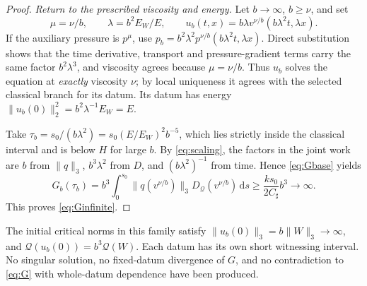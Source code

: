 \documentclass[11pt,a4paper]{article}
\theoremstyle{definition}
\theoremstyle{remark}
\newcommand{\Q}{\mathcal Q}
\newcommand{\dd}{\,\mathrm d}
\newcommand{\norm}[1]{\lVert #1\rVert}
\numberwithin{equation}{section}
\begin{document}
\begin{proof}
\emph{Return to the prescribed viscosity and energy.} Let \(b\to\infty\), \(b\ge\nu\), and set
\[
\mu=\nu/b,\qquad \lambda=b^2E_W/E,
\qquad u_b(t,x)=b\lambda v^{\nu/b}(b\lambda^2t,\lambda x).
\]
If the auxiliary pressure is \(p^\mu\), use \(p_b=b^2\lambda^2p^{\nu/b}(b\lambda^2t,\lambda x)\). Direct substitution shows that the time derivative, transport and pressure-gradient terms carry the same factor \(b^2\lambda^3\), and viscosity agrees because \(\mu=\nu/b\). Thus \(u_b\) solves the equation at \emph{exactly} viscosity \(\nu\); by local uniqueness it agrees with the selected classical branch for its datum. Its datum has energy
\(\norm{u_b(0)}_2^2=b^2\lambda^{-1}E_W=E\).

Take \(\tau_b=s_0/(b\lambda^2)=s_0(E/E_W)^2b^{-5}\), which lies strictly inside the classical interval and is below \(H\) for large \(b\). By \eqref{eq:scaling}, the factors in the joint work are \(b\) from \(\norm q_3\), \(b^3\lambda^2\) from \(D\), and \((b\lambda^2)^{-1}\) from time. Hence \eqref{eq:Gbase} yields
\[
G_b(\tau_b)=b^3\int_0^{s_0}\norm{q(v^{\nu/b})}_3D_{\Q}(v^{\nu/b})\dd s
\ge\frac{ks_0}{2C_\sharp}b^3\longrightarrow\infty.
\]
This proves \eqref{eq:Ginfinite}.
\end{proof}

The initial critical norms in this family satisfy \(\norm{u_b(0)}_3=b\norm W_3\to\infty\), and \(\Q(u_b(0))=b^3\Q(W)\). Each datum has its own short witnessing interval. No singular solution, no fixed-datum divergence of \(G\), and no contradiction to \eqref{eq:G} with whole-datum dependence have been produced.
\end{document}
